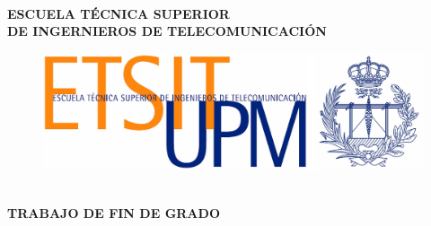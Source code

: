 \documentclass[11pt,a4paper]{report}
\begin{document}
\clearpage

\centering
{}\\[10mm]
\large{\textbf{ESCUELA TÉCNICA SUPERIOR \\DE INGERNIEROS DE TELECOMUNICACIÓN}}\\[10mm]
\begin{figure}[H]
	\centering
	\includegraphics[width=0.55\linewidth]{logoescuela.jpg}
\end{figure}
\\[7mm]
\LARGE{\textbf{TRABAJO DE FIN DE GRADO}}\\[15mm]
\end{document}
